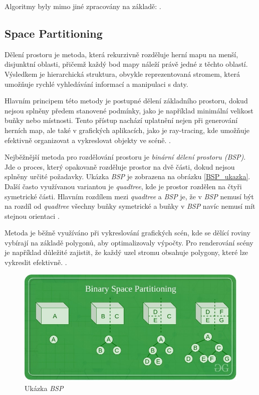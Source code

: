 Algoritmy byly mimo jiné zpracovány na základě: \cite{PCGinG}.

\subsection{Space Partitioning}


Dělení prostoru je metoda, která rekurzivně rozděluje herní mapu na menší, disjunktní oblasti, přičemž každý bod mapy náleží právě jedné z těchto oblastí. Výsledkem je hierarchická struktura, obvykle reprezentovaná stromem, která umožňuje rychlé vyhledávání informací a manipulaci s daty.

Hlavním principem této metody je postupné dělení základního prostoru, dokud nejsou splněny předem stanovené podmínky, jako je například minimální velikost buňky nebo místnosti. Tento přístup nachází uplatnění nejen při generování herních map, ale také v grafických aplikacích, jako je ray-tracing, kde umožňuje efektivně organizovat a vykreslovat objekty ve scéně. \cite{PCGclanek}.

Nejběžnější metoda pro rozdělování prostoru je \textit{binární dělení prostoru (BSP)}. Jde o proces, který opakovaně rozděluje prostor na dvě části, dokud nejsou splněny určité požadavky. Ukázka \textit{BSP} je zobrazena na obrázku \vref{BSP_ukazka}. Další často využívanou variantou je \textit{quadtree}, kde je prostor rozdělen na čtyři symetrické části. Hlavním rozdílem mezi \textit{quadtree} a \textit{BSP} je, že v \textit{BSP} nemusí být na rozdíl od \textit{quadtree} všechny buňky symetrické a buňky v \textit{BSP} navíc nemusí mít stejnou orientaci \cite{BSPclanek}.

Metoda je běžně využíváno při vykreslování grafických scén, kde se dělící roviny vybírají na základě polygonů, aby optimalizovaly výpočty. Pro renderování scény je například důležité zajistit, že každý uzel stromu obsahuje polygony, které lze vykreslit efektivně. \cite{BSPclanek}.

\begin{figure}
  \centering      %
  \includegraphics[scale=0.6]{obr/BSP.jpg} %
  \caption{Ukázka \textit{BSP} \cite{BSPclanek}} %
  \label{BSP_ukazka} %
\end{figure}

